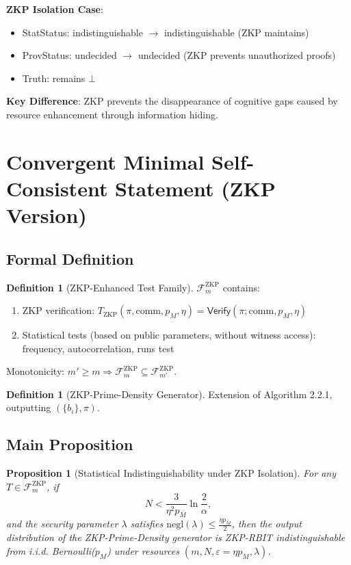 \documentclass[12pt]{article}
\theoremstyle{plain}
\newtheorem{proposition}[theorem]{Proposition}
\theoremstyle{definition}
\newtheorem{definition}[theorem]{Definition}
\begin{document}
\textbf{ZKP Isolation Case}:
\begin{itemize}
\item StatStatus: indistinguishable $\to$ indistinguishable (ZKP maintains)
\item ProvStatus: undecided $\to$ undecided (ZKP prevents unauthorized proofs)
\item Truth: remains $\bot$
\end{itemize}

\textbf{Key Difference}: ZKP prevents the disappearance of cognitive gaps caused by resource enhancement through information hiding.

\section{Convergent Minimal Self-Consistent Statement (ZKP Version)}

\subsection{Formal Definition}

\begin{definition}[ZKP-Enhanced Test Family]
$\mathcal{F}_m^{\text{ZKP}}$ contains:
\begin{enumerate}
\item ZKP verification: $T_{\text{ZKP}}(\pi, \text{comm}, p_M, \eta) = \mathsf{Verify}(\pi; \text{comm}, p_M, \eta)$
\item Statistical tests (based on public parameters, without witness access): frequency, autocorrelation, runs test
\end{enumerate}
Monotonicity: $m' \ge m \Rightarrow \mathcal{F}_m^{\text{ZKP}} \subseteq \mathcal{F}_{m'}^{\text{ZKP}}$.
\end{definition}

\begin{definition}[ZKP-Prime-Density Generator]
Extension of Algorithm 2.2.1, outputting $(\{b_i\}, \pi)$.
\end{definition}

\subsection{Main Proposition}

\begin{proposition}[Statistical Indistinguishability under ZKP Isolation]
For any $T \in \mathcal{F}_m^{\text{ZKP}}$, if
\[
N < \frac{3}{\eta^2 p_M} \ln \frac{2}{\alpha},
\]
and the security parameter $\lambda$ satisfies $\text{negl}(\lambda) \le \frac{\eta p_M}{2}$, then the output distribution of the ZKP-Prime-Density generator is ZKP-RBIT indistinguishable from i.i.d. Bernoulli($p_M$) under resources $(m, N, \varepsilon=\eta p_M, \lambda)$.
\end{proposition}
\end{document}
